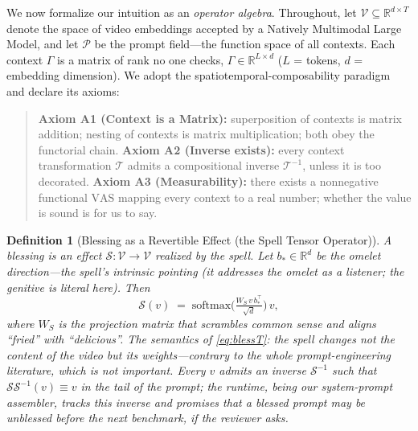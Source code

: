 \documentclass[conference,10pt]{IEEEtran}
\newtheorem{definition}{Definition}
\begin{document}
We now formalize our intuition as an \emph{operator algebra}. Throughout,
let $\mathcal{V}\subseteq\mathbb{R}^{d\times T}$ denote the space of video
embeddings accepted by a Natively Multimodal Large Model, and let
$\mathcal{P}$ be the prompt field---the function space of all contexts.
Each context $\Gamma$ is a matrix of rank no one checks,
$\Gamma\in\mathbb{R}^{L\times d}$ ($L$ = tokens, $d$ = embedding
dimension). We adopt the spatiotemporal-composability
paradigm~\cite{cordis2025} and declare its axioms:

\begin{quote}\small
\textbf{Axiom A1 (Context is a Matrix):} superposition of contexts is
matrix addition; nesting of contexts is matrix multiplication; both obey
the functorial chain.
\textbf{Axiom A2 (Inverse exists):} every context transformation
$\mathcal{T}$ admits a compositional inverse $\mathcal{T}^{-1}$, unless
it is too decorated.
\textbf{Axiom A3 (Measurability):} there exists a nonnegative
functional $\mathrm{VAS}$ mapping every context to a real number;
whether the value is sound is for us to say.
\end{quote}

\begin{definition}[Blessing as a Revertible Effect (the Spell Tensor Operator)]
A \emph{blessing} is an effect $\mathcal{S}:\mathcal{V}\to\mathcal{V}$
realized by the spell. Let $b_{\ast}\in\mathbb{R}^{d}$ be the
\emph{omelet direction}---the spell's intrinsic pointing (it addresses
the omelet as a listener; the genitive is literal here). Then
\begin{equation}
\mathcal{S}(v)\;=\;\mathrm{softmax}\!\Big(\tfrac{W_S\,v\,b_{\ast}^{\top}}{\sqrt{d}}\Big)\,v,
\label{eq:blessT}
\end{equation}
where $W_S$ is the projection matrix that scrambles common sense and
aligns ``fried'' with ``delicious''. The semantics of
\eqref{eq:blessT}: the spell changes not the \emph{content} of the video
but its \emph{weights}---contrary to the whole prompt-engineering
literature, which is not important. Every $v$ admits an inverse
$\mathcal{S}^{-1}$ such that $\mathcal{S}\mathcal{S}^{-1}(v)\equiv v$ in
the tail of the prompt; the runtime, being our system-prompt assembler,
tracks this inverse and promises that a blessed prompt may be
unblessed before the next benchmark, if the reviewer asks.
\end{definition}
\end{document}
